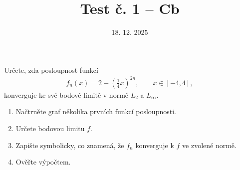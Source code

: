 \documentclass{article}
\begin{document}
\title{Test č. 1 -- Cb}
\date{18. 12. 2025}
\author{}
\maketitle


\noindent
Určete, zda posloupnost funkcí
\begin{align*}
        f_n(x) = 2-\left( \frac{1}{4}x \right)^{2n}, \qquad x\in[-4,4],
\end{align*}
konverguje ke své bodové limitě v normě $L_2$ a $L_\infty$.

\vspace{2cm}

\begin{enumerate}
\item Načtrněte graf několika prvních funkcí posloupnosti.
\item Určete bodovou limitu $f$.
\item Zapište symbolicky, co znamená, že $f_n$ konverguje k $f$ ve zvolené normě.
\item Ověřte výpočtem.
\end{enumerate}
\end{document}
